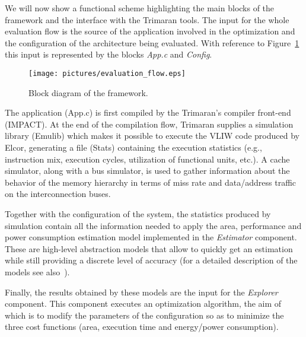 We will now show a functional scheme highlighting the main blocks of
the \ee{} framework and the interface with the Trimaran tools. The
input for the whole evaluation flow is the source of the application
involved in the optimization and the configuration of the architecture
being evaluated.  With reference to Figure~\ref{fig:evaluation_flow}
this input is represented by the blocks \emph{App.c} and
\emph{Config}.
\begin{figure}
        \centering
        \texttt{[image: pictures/evaluation\_flow.eps]}
        \caption{Block diagram of the framework.}
        \label{fig:evaluation_flow}
\end{figure}

The application (App.c) is first compiled by the Trimaran's compiler
front-end (IMPACT). At the end of the compilation flow,
Trimaran supplies a simulation library (Emulib) which makes it
possible to execute the VLIW code produced by Elcor, generating a file
(Stats) containing the execution statistics (e.g., instruction mix,
execution cycles, utilization of functional units, etc.). A cache
simulator, along with a bus simulator, is used to gather information
about the behavior of the memory hierarchy in terms of miss rate and
data/address traffic on the interconnection buses.

Together with the configuration of the system, the statistics produced
by simulation contain all the information needed to apply the area,
performance and power consumption estimation model implemented in the
\emph{Estimator} component. These are high-level abstraction models
that allow to quickly get an estimation while still providing a
discrete level of accuracy (for a detailed description of the models
see also~\cite{palpatti_estimedia03}).

Finally, the results obtained by these
models are the input for the \emph{Explorer} component. This component
executes an optimization algorithm, the aim of which is to modify the
parameters of the configuration so as to minimize the three cost
functions (area, execution time and energy/power consumption).

